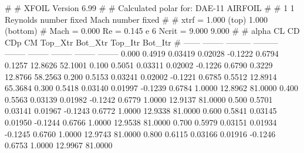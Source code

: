 #  
#       XFOIL         Version 6.99
#  
# Calculated polar for: DAE-11 AIRFOIL                                  
#  
# 1 1 Reynolds number fixed          Mach number fixed         
#  
# xtrf =   1.000 (top)        1.000 (bottom)  
# Mach =   0.000     Re =     0.145 e 6     Ncrit =   9.000  9.000
#  
#   alpha    CL        CD       CDp       CM     Top_Xtr  Bot_Xtr  Top_Itr  Bot_Itr
#  ------ -------- --------- --------- -------- -------- -------- -------- --------
   0.000   0.4919   0.03419   0.02028  -0.1222   0.6794   0.1257  12.8626  52.1001
   0.100   0.5051   0.03311   0.02002  -0.1226   0.6790   0.3229  12.8766  58.2563
   0.200   0.5153   0.03241   0.02002  -0.1221   0.6785   0.5512  12.8914  65.3684
   0.300   0.5418   0.03140   0.01997  -0.1239   0.6784   1.0000  12.8962  81.0000
   0.400   0.5563   0.03139   0.01982  -0.1242   0.6779   1.0000  12.9137  81.0000
   0.500   0.5701   0.03141   0.01967  -0.1243   0.6772   1.0000  12.9338  81.0000
   0.600   0.5841   0.03145   0.01950  -0.1244   0.6766   1.0000  12.9538  81.0000
   0.700   0.5979   0.03151   0.01934  -0.1245   0.6760   1.0000  12.9743  81.0000
   0.800   0.6115   0.03166   0.01916  -0.1246   0.6753   1.0000  12.9967  81.0000
